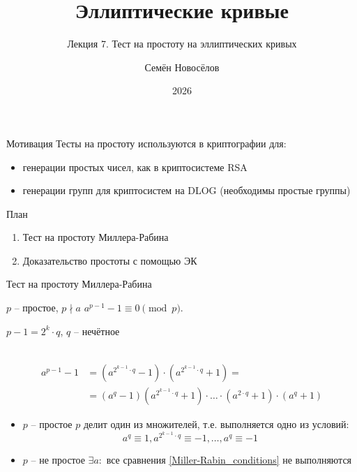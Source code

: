 \documentclass{beamer}
\title{Эллиптические кривые}
\subtitle{Лекция 7. Тест на простоту на эллиптических кривых}
\author{Семён Новосёлов}
\institute{БФУ им. И. Канта}
\date{2026}
\begin{document}
\frame{\titlepage}

\begin{frame}{Мотивация}
	Тесты на простоту используются в криптографии для:
	\vspace{0.5em}
	\begin{itemize}
	    \item генерации простых чисел, как в криптосистеме RSA
	    \item генерации групп для криптосистем на DLOG (необходимы простые группы)
	\end{itemize}
\end{frame}

\begin{frame}{План}
	\begin{enumerate}
		\item Тест на простоту Миллера-Рабина
		\item Доказательство простоты с помощью ЭК
	\end{enumerate}
\end{frame}

\begin{frame}{Тест на простоту Миллера-Рабина}%
\begin{center}
    \begin{tcolorbox}[enhanced,hbox,colback=title-and-section-color!5,colframe=title-and-section-color!120,title=Малая теорема Ферма,center title]
        \begin{varwidth}{\textwidth}
            \begin{center}
            $p$ -- простое, $p \nmid a$ \structure{$\implies$} $a^{p-1} - 1 \equiv 0 \pmod{p}$. 
            \end{center}
        \end{varwidth}
    \end{tcolorbox}	
\end{center}
\begin{center}
$p-1 = 2^k \cdot q$, $q$ -- нечётное\\
\structure{$\Downarrow$}\\
\end{center}
\begin{equation*}
\begin{split}
    a^{p-1} - 1 &= (a^{2^{k-1} \cdot q} - 1) \cdot (a^{2^{k-1} \cdot q} + 1) =\\&= (a^q - 1) (a^{2^{k-1} \cdot q} + 1) \cdot \ldots \cdot (a^{2 \cdot q} + 1) \cdot (a^q + 1)
\end{split}
\end{equation*}
\begin{itemize}
    \item $p$ -- простое \structure{$\implies$} $p$ делит один из множителей, т.е. выполняется одно из условий:
    \begin{equation}
        \label{Miller-Rabin_conditions}
        a^q \equiv 1, a^{2^{k-1} \cdot q} \equiv -1, \ldots, a^{q} \equiv -1
    \end{equation}
    \item $p$ -- не простое \structure{$\implies$} $\exists a:$ все сравнения \eqref{Miller-Rabin_conditions} не выполняются
\end{itemize}
\end{frame}
\end{document}
